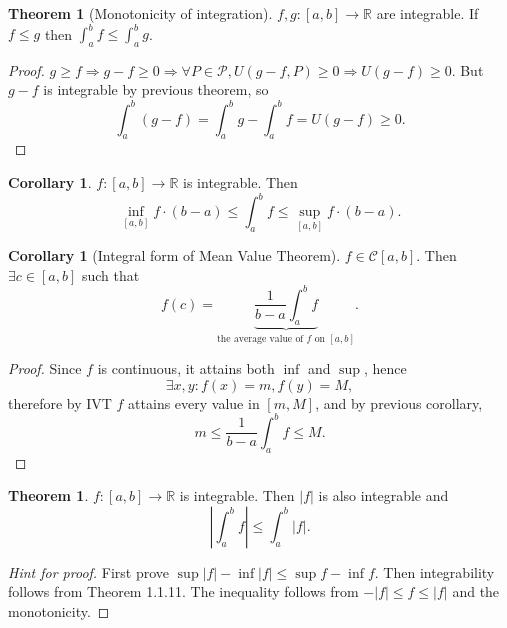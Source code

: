\documentclass[a4paper]{article}
\theoremstyle{definition}
\newtheorem{thm}[defn]{Theorem}
\newtheorem{coro}[defn]{Corollary}
\begin{document}
\begin{thm}[Monotonicity of integration]
	$f,g:[a,b]\rightarrow \mathbb R$ are integrable. If $f \leq g$ then $\int_a^b f \leq \int_a^b g$.
\end{thm}
\begin{proof}
	$g \geq f \Rightarrow g-f \geq 0 \Rightarrow \forall P \in \mathcal P, U(g-f,P) \geq 0 \Rightarrow U(g-f)\geq 0 $. But $g-f$ is integrable by previous theorem, so
\[
\int_a^b (g-f) = \int_a^b g-\int_a^b f = U(g-f) \geq 0 .
\]
\end{proof}

\begin{coro}
	$f:[a,b]\rightarrow \mathbb R$ is integrable. Then
\[
\underset{[a,b]}{\inf} f \cdot (b-a) \leq \int_a^b f \leq \underset{[a,b]}{\sup} f \cdot (b-a) .
\]
\end{coro}

\begin{coro}[Integral form of Mean Value Theorem]
	$f\in \mathcal C [a,b]$. Then $\exists c\in [a,b]$ such that
\[
f(c)=\underbrace{\frac{1}{b-a} \int_a^b f}_{\text{the average value of }f\text{ on }[a,b]} .
\]
\end{coro}
\begin{proof}
	Since $f$ is continuous, it attains both $\inf$ and $\sup$, hence
\[
\exists x,y : f(x)=m,f(y)=M,
\]
therefore by IVT $f$ attains every value in $[m,M]$, and by previous corollary,
\[
m\leq \frac1{b-a}\int_a^b f \leq M.
\]
\end{proof}

\begin{thm}
	$f:[a,b]\rightarrow \mathbb R$ is integrable. Then $|f|$ is also integrable and
\[
\left|\int_a^b f \right| \leq \int_a^b |f| .
\]
\end{thm}
\begin{proof}[Hint for proof]
	First prove $\sup |f| - \inf |f| \leq \sup f - \inf f$. Then integrability follows from Theorem 1.1.11. The inequality follows from $-|f| \leq f \leq |f|$ and the monotonicity.
\end{proof}
\end{document}
